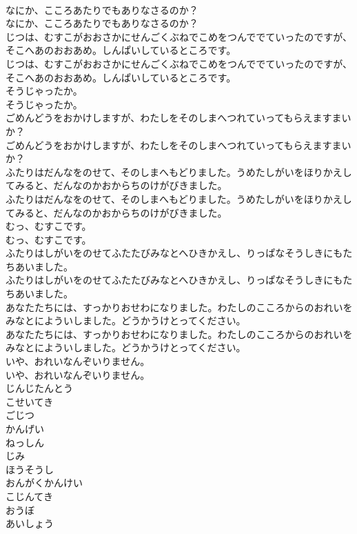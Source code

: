 \documentclass[8pt]{extreport}
\begin{document}
\begin{CJK}{UTF8}{min}
\\	なにか、こころあたりでもありなさるのか？	
\\	なにか、こころあたりでもありなさるのか？ 
\\	じつは、むすこがおおさかにせんごくぶねでこめをつんででていったのですが、そこへあのおおあめ。しんぱいしているところです。	
\\	じつは、むすこがおおさかにせんごくぶねでこめをつんででていったのですが、そこへあのおおあめ。しんぱいしているところです。 
\\	そうじゃったか。	
\\	そうじゃったか。 
\\	ごめんどうをおかけしますが、わたしをそのしまへつれていってもらえますまいか？	
\\	ごめんどうをおかけしますが、わたしをそのしまへつれていってもらえますまいか？ 
\\	ふたりはだんなをのせて、そのしまへもどりました。うめたしがいをほりかえしてみると、だんなのかおからちのけがびきました。	
\\	ふたりはだんなをのせて、そのしまへもどりました。うめたしがいをほりかえしてみると、だんなのかおからちのけがびきました。 
\\	むっ、むすこです。	
\\	むっ、むすこです。 
\\	ふたりはしがいをのせてふたたびみなとへひきかえし、りっぱなそうしきにもたちあいました。	
\\	ふたりはしがいをのせてふたたびみなとへひきかえし、りっぱなそうしきにもたちあいました。 
\\	あなたたちには、すっかりおせわになりました。わたしのこころからのおれいをみなとによういしました。どうかうけとってください。	
\\	あなたたちには、すっかりおせわになりました。わたしのこころからのおれいをみなとによういしました。どうかうけとってください。 
\\	いや、おれいなんぞいりません。	
\\	いや、おれいなんぞいりません。 
\\	じんじたんとう
\\	こせいてき
\\	ごじつ
\\	かんげい
\\	ねっしん
\\	じみ
\\	ほうそうし
\\	おんがくかんけい
\\	こじんてき
\\	おうぼ
\\	あいしょう

\end{CJK}
\end{document}
